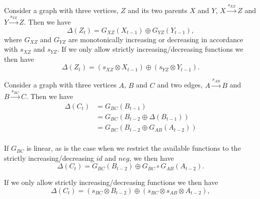 \documentclass[]{article}
\begin{document}
Consider a graph with three vertices, $Z$ and its two parents
$X$ and $Y$, $X\xrightarrow{s_{XZ}} Z$ and $Y\xrightarrow{s_{YZ}} Z$.
%
Then we have
\[\Delta(Z_t) = G_{XZ}(X_{t-1}) \oplus G_{YZ}(Y_{t-1}),\]
where $G_{XZ}$ and $G_{YZ}$ are monotonically increasing or decreasing in
accordance with $s_{XZ}$ and $s_{YZ}$.
%
If we only allow strictly increasing/decreasing functions we then have
\[\Delta(Z_t) = (s_{XZ}\otimes X_{t-1})\oplus (s_{YZ}\otimes Y_{t-1}).\]

Consider a graph with three vertices $A$, $B$ and $C$ and two edges,
$A\xrightarrow{s_{AB}} B$ and $B\xrightarrow{s_{BC}} C$. Then we have
\begin{align*}
\Delta(C_t) &= G_{BC}(B_{t-1})\\
&= G_{BC}(B_{t-2} \oplus \Delta(B_{t-1}))\\
&= G_{BC}(B_{t-2}  \oplus G_{AB}(A_{t-2}))\\
\end{align*}

If $G_{BC}$ is linear, as is the case when we restrict the available functions
to the strictly increasing/decreasing $id$ and $neg$,
we then have
\[\Delta(C_t) = G_{BC}(B_{t-2})\oplus G_{BC}\circ G_{AB}(A_{t-2}).\]

If we only allow strictly increasing/decreasing functions we then have
\[\Delta(C_t) = (s_{BC}\otimes B_{t-2})\oplus (s_{BC}\otimes s_{AB}\otimes A_{t-2}),\]
\end{document}

